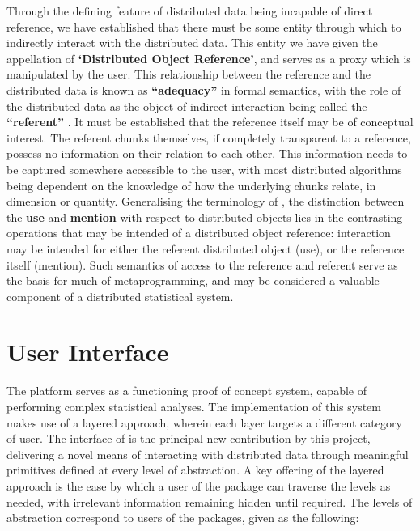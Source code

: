 \documentclass[letterpaper, inpress]{jds} %
\begin{document}
Through the defining feature of distributed data being incapable of direct reference, we have established that there must be some entity through which to indirectly interact with the distributed data.
This entity we have given the appellation of \textbf{`Distributed Object Reference'}, and serves as a proxy which is manipulated by the user.
This relationship between the reference and the distributed data is known as \textbf{``adequacy''} in formal semantics, with the role of the distributed data as the object of indirect interaction being called the \textbf{``referent''} \citep{gordon1984}.
It must be established that the reference itself may be of conceptual interest.
The referent chunks themselves, if completely transparent to a reference, possess no information on their relation to each other.
This information needs to be captured somewhere accessible to the user, with most distributed algorithms being dependent on the knowledge of how the underlying chunks relate, in dimension or quantity. 
Generalising the terminology of \citet{quine1979}, the distinction between the \textbf{use} and \textbf{mention} with respect to  distributed objects lies in the contrasting operations that may be intended of a distributed object reference: interaction may be intended for either the referent distributed object (use), or the reference itself (mention).
Such semantics of access to the reference and referent serve as the basis for much of metaprogramming, and may be considered a valuable component of a distributed statistical system.

\section{User Interface}\label{sec:ui}

The  platform serves as a functioning proof of concept system, capable of performing complex statistical analyses.
The implementation of this system makes use of a layered approach, wherein each layer targets a different category of user.
The interface of  is the principal new contribution by this project, delivering a novel means of interacting with distributed data through meaningful primitives defined at every level of abstraction.
A key offering of the layered approach is the ease by which a user of the package can traverse the levels as needed, with irrelevant information remaining hidden until required.
The levels of abstraction correspond to users of the packages, given as the following:
\end{document}
